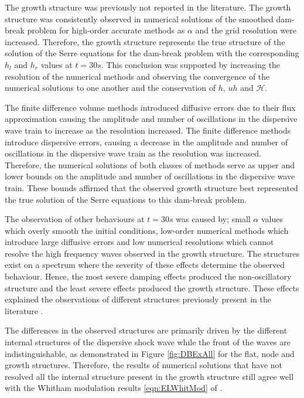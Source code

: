The growth structure was previously not reported in the literature. The growth structure was consistently observed in numerical solutions of the smoothed dam-break problem for high-order accurate methods as $\alpha$ and the grid resolution were increased. Therefore, the growth structure represents the true structure of the solution of the Serre equations for the dam-break problem with the corresponding $h_l$ and $h_r$ values at $t=30s$. This conclusion was supported by increasing the resolution of the numerical methods and observing the convergence of the numerical solutions to one another and the conservation of $h$, $uh$ and $\mathcal{H}$. 

The finite difference volume methods introduced diffusive errors due to their flux approximation causing the amplitude and number of oscillations in the dispersive wave train to increase as the resolution increased. The finite difference methods introduce dispersive errors, causing a decrease in the amplitude and number of oscillations in the dispersive wave train as the resolution was increased. Therefore, the numerical solutions of both classes of methods serve as upper and lower bounds on the amplitude and number of oscillations in the dispersive wave train. These bounds affirmed that the observed growth structure best represented the true solution of the Serre equations to this dam-break problem. 

The observation of other behaviours at $t=30s$ was caused by; small $\alpha$ values which overly smooth the initial conditions, low-order numerical methods which introduce large diffusive errors and low numerical resolutions which cannot resolve the high frequency waves observed in the growth structure. The structures exist on a spectrum where the severity of these effects determine the observed behaviour. Hence, the most severe damping effects produced the non-oscillatory structure and the least severe effects produced the growth structure. These effects explained the observations of different structures previously present in the literature \cite{El-etal-2006,Hank-etal-2010-2034,Mitsotakis-etal-2014,Mitsotakis-etal-2017}. 

The differences in the observed structures are primarily driven by the different internal structures of the dispersive shock wave while the front of the waves are indistinguishable, as demonstrated in Figure \ref{fig:DBExAll} for the flat, node and growth structures. Therefore, the results of numerical solutions that have not resolved all the internal structure present in the growth structure still agree well with the Whitham modulation results \eqref{eqn:ELWhitMod} of \citet{El-etal-2006}.

